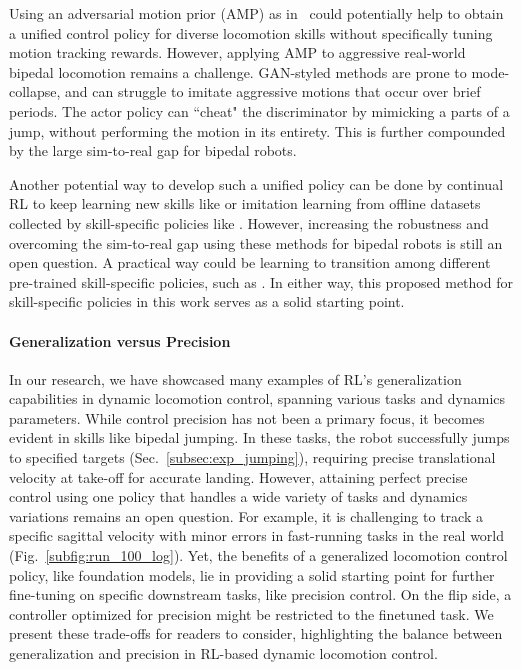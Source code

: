 Using an adversarial motion prior (AMP) as in~\cite{peng2021amp} could potentially help to obtain a unified control policy for diverse locomotion skills without specifically tuning motion tracking rewards. However, applying AMP to aggressive real-world bipedal locomotion remains a challenge. GAN-styled methods are prone to mode-collapse, and can struggle to imitate aggressive motions that occur over brief periods. The actor policy can “cheat" the discriminator by mimicking a parts of a jump, without performing the motion in its entirety. This is further compounded by the large sim-to-real gap for bipedal robots.  

Another potential way to develop such a unified policy can be done by continual RL to keep learning new skills like \cite{liu2023continual} or imitation learning from offline datasets collected by skill-specific policies like \cite{huang2024diffuseloco}. 
However, increasing the robustness and overcoming the sim-to-real gap using these methods for bipedal robots is still an open question. A practical way could be learning to transition among different pre-trained skill-specific policies, such as \cite{lee2018composing}. 
In either way, this proposed method for skill-specific policies in this work serves as a solid starting point.




\paragraph{Generalization versus Precision}
In our research, we have showcased many examples of RL's generalization capabilities in dynamic locomotion control, spanning various tasks and dynamics parameters. 
While control precision has not been a primary focus, it becomes evident in skills like bipedal jumping. 
In these tasks, the robot successfully jumps to specified targets (Sec.~\ref{subsec:exp_jumping}), requiring precise translational velocity at take-off for accurate landing. 
However, attaining perfect precise control using one policy that handles a wide variety of tasks and dynamics variations remains an open question. For example, it is challenging to track a specific sagittal velocity with minor errors in fast-running tasks in the real world (Fig.~\ref{subfig:run_100_log}).
Yet, the benefits of a generalized locomotion control policy, like foundation models, lie in providing a solid starting point for further fine-tuning on specific downstream tasks, like precision control.
On the flip side, a controller optimized for precision might be restricted to the finetuned task.
We present these trade-offs for readers to consider, highlighting the balance between generalization and precision in RL-based dynamic locomotion control.